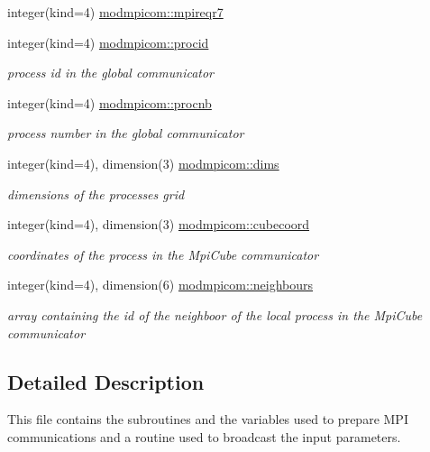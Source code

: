 \begin{DoxyCompactItemize}
integer(kind=4) \hyperlink{namespacemodmpicom_ad55af2a3154bdc4be9156046d29af59d}{modmpicom\+::mpireqr7}
\item 
integer(kind=4) \hyperlink{namespacemodmpicom_a0a592a5f03c3c0d61e07b5a56fd161d1}{modmpicom\+::procid}
\begin{DoxyCompactList}\small\item\em process id in the global communicator \end{DoxyCompactList}\item 
integer(kind=4) \hyperlink{namespacemodmpicom_a5e40853b0f15e4c14658ea56fb1b9b73}{modmpicom\+::procnb}
\begin{DoxyCompactList}\small\item\em process number in the global communicator \end{DoxyCompactList}\item 
integer(kind=4), dimension(3) \hyperlink{namespacemodmpicom_a8762b65024b222a0c5bfab4f8af21d7d}{modmpicom\+::dims}
\begin{DoxyCompactList}\small\item\em dimensions of the processes grid \end{DoxyCompactList}\item 
integer(kind=4), dimension(3) \hyperlink{namespacemodmpicom_a533718abb8ce3f03b430dfbf9f821069}{modmpicom\+::cubecoord}
\begin{DoxyCompactList}\small\item\em coordinates of the process in the Mpi\+Cube communicator \end{DoxyCompactList}\item 
integer(kind=4), dimension(6) \hyperlink{namespacemodmpicom_a818e6dbfc3705e5d5bddb752f2aeb5aa}{modmpicom\+::neighbours}
\begin{DoxyCompactList}\small\item\em array containing the id of the neighboor of the local process in the Mpi\+Cube communicator \end{DoxyCompactList}\end{DoxyCompactItemize}


\subsection{Detailed Description}
This file contains the subroutines and the variables used to prepare M\+PI communications and a routine used to broadcast the input parameters. 


